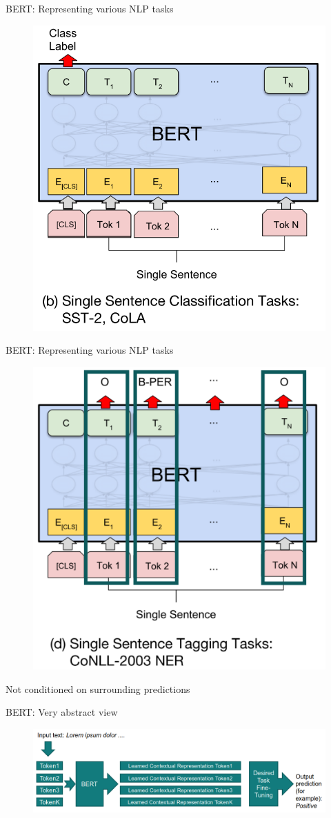 \documentclass[12pt]{beamer}
\begin{document}
\begin{frame}{BERT: Representing various NLP tasks}
	
	\begin{figure}
		\includegraphics[width=0.6\linewidth]{img/task2.png}
	\end{figure}
	
	
\end{frame}



\begin{frame}{BERT: Representing various NLP tasks}
	
	\begin{figure}
		\includegraphics[width=0.5\linewidth]{img/task3.png}
	\end{figure}


Not conditioned on surrounding predictions	

\end{frame}

\begin{frame}{BERT: Very abstract view}
	
	\begin{figure}
		\includegraphics[width=\linewidth]{img/bert1.png}
	\end{figure}	
	
\end{frame}
\end{document}
